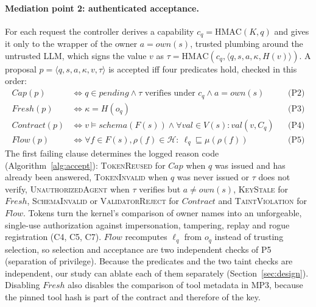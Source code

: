 \documentclass[pdflatex,sn-mathphys-num]{sn-jnl}
\theoremstyle{thmstyleone}%
\theoremstyle{thmstyletwo}%
\theoremstyle{thmstylethree}%
\begin{document}
\paragraph{Mediation point 2: authenticated acceptance.} For each request the controller derives a capability $c_q = \mathrm{HMAC}(K, q)$ and gives it only to the wrapper of the owner $a = \mathit{own}(s)$, trusted plumbing around the untrusted LLM, which signs the value $v$ as $\tau = \mathrm{HMAC}(c_q, \langle q, s, a, \kappa, H(v)\rangle)$. A proposal $p = \langle q, s, a, \kappa, v, \tau\rangle$ is accepted iff four predicates hold, checked in this order:
\begin{align*}
\mathit{Cap}(p) &\iff q \in \mathit{pending} \land \tau \text{ verifies under } c_q \land a = \mathit{own}(s) && \text{(P2)}\\
\mathit{Fresh}(p) &\iff \kappa = H(o_q) && \text{(P3)}\\
\mathit{Contract}(p) &\iff v \models \mathit{schema}(F(s)) \land \forall \mathit{val} \in V(s)\colon \mathit{val}(v, C_q) && \text{(P4)}\\
\mathit{Flow}(p) &\iff \forall f \in F(s), \rho(f) \in \mathcal{H}\colon\ \ell_q \sqsubseteq \mu(\rho(f)) && \text{(P5)}
\end{align*}
The first failing clause determines the logged reason code (Algorithm~\ref{alg:accept}): \textsc{TokenReused} for $\mathit{Cap}$ when $q$ was issued and has already been answered, \textsc{TokenInvalid} when $q$ was never issued or $\tau$ does not verify, \textsc{UnauthorizedAgent} when $\tau$ verifies but $a \neq \mathit{own}(s)$, \textsc{KeyStale} for $\mathit{Fresh}$, \textsc{SchemaInvalid} or \textsc{ValidatorReject} for $\mathit{Contract}$ and \textsc{TaintViolation} for $\mathit{Flow}$. Tokens turn the kernel's comparison of owner names into an unforgeable, single-use authorization against impersonation, tampering, replay and rogue registration (C4, C5, C7). $\mathit{Flow}$ recomputes $\ell_q$ from $o_q$ instead of trusting selection, so selection and acceptance are two independent checks of P5 (separation of privilege). Because the predicates and the two taint checks are independent, our study can ablate each of them separately (Section~\ref{sec:design}). Disabling $\mathit{Fresh}$ also disables the comparison of tool metadata in MP3, because the pinned tool hash is part of the contract and therefore of the key.
\end{document}
